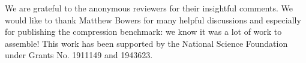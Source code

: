 \documentclass[acmsmall,screen,nonacm,review=false,timestamp=false]{acmart}
\newif\iflong
\begin{document}









\begin{acks}
  We are grateful to the anonymous reviewers for their insightful comments.
  We would like to thank Matthew Bowers for many helpful discussions
  and especially for publishing the \dc compression benchmark:
  we know it was a lot of work to assemble!
  This work has been supported by the National Science Foundation under Grants No. 1911149 and 1943623.
\end{acks}
  




\clearpage
\appendix

\end{document}

